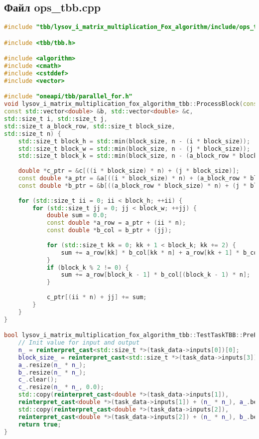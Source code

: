 \documentclass[12pt,a4paper]{extarticle}
\begin{document}
\subsection*{Файл ops\_tbb.cpp}
\begin{lstlisting}[language=C++]
#include "tbb/lysov_i_matrix_multiplication_Fox_algorithm/include/ops_tbb.hpp"

#include <tbb/tbb.h>

#include <algorithm>
#include <cmath>
#include <cstddef>
#include <vector>

#include "oneapi/tbb/parallel_for.h"
void lysov_i_matrix_multiplication_fox_algorithm_tbb::ProcessBlock(const std::vector<double> &a,
const std::vector<double> &b, std::vector<double> &c,
std::size_t i, std::size_t j,
std::size_t a_block_row, std::size_t block_size,
std::size_t n) {
	std::size_t block_h = std::min(block_size, n - (i * block_size));
	std::size_t block_w = std::min(block_size, n - (j * block_size));
	std::size_t block_k = std::min(block_size, n - (a_block_row * block_size));
	
	double *c_ptr = &c[((i * block_size) * n) + (j * block_size)];
	const double *a_ptr = &a[((i * block_size) * n) + (a_block_row * block_size)];
	const double *b_ptr = &b[((a_block_row * block_size) * n) + (j * block_size)];
	
	for (std::size_t ii = 0; ii < block_h; ++ii) {
		for (std::size_t jj = 0; jj < block_w; ++jj) {
			double sum = 0.0;
			const double *a_row = a_ptr + (ii * n);
			const double *b_col = b_ptr + (jj);
			
			for (std::size_t kk = 0; kk + 1 < block_k; kk += 2) {
				sum += a_row[kk] * b_col[kk * n] + a_row[kk + 1] * b_col[(kk + 1) * n];
			}
			if (block_k % 2 != 0) {
				sum += a_row[block_k - 1] * b_col[(block_k - 1) * n];
			}
			
			c_ptr[(ii * n) + jj] += sum;
		}
	}
}

bool lysov_i_matrix_multiplication_fox_algorithm_tbb::TestTaskTBB::PreProcessingImpl() {
	// Init value for input and output
	n_ = reinterpret_cast<std::size_t *>(task_data->inputs[0])[0];
	block_size_ = reinterpret_cast<std::size_t *>(task_data->inputs[3])[0];
	a_.resize(n_ * n_);
	b_.resize(n_ * n_);
	c_.clear();
	c_.resize(n_ * n_, 0.0);
	std::copy(reinterpret_cast<double *>(task_data->inputs[1]),
	reinterpret_cast<double *>(task_data->inputs[1]) + (n_ * n_), a_.begin());
	std::copy(reinterpret_cast<double *>(task_data->inputs[2]),
	reinterpret_cast<double *>(task_data->inputs[2]) + (n_ * n_), b_.begin());
	return true;
}


\end{lstlisting}
\end{document}
